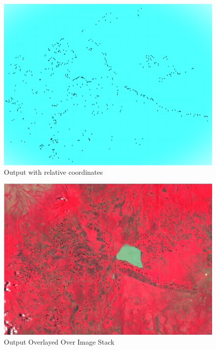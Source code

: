 \documentclass[10pt]{article}
\begin{document}
\begin{figure} [H]
    \centering
    \includegraphics[width=1\linewidth]{images/cv_output.png}
    \caption{Output with relative coordinates}
    \label{fig:OutputOnSample}
\end{figure}

\begin{figure} [H]
    \centering
    \includegraphics[width=1\linewidth]{images/Outputoverlayrealmap.png}
    \caption{Output Overlayed Over Image Stack}
    \label{fig:OverlayedMap}
\end{figure}

\end{document}
